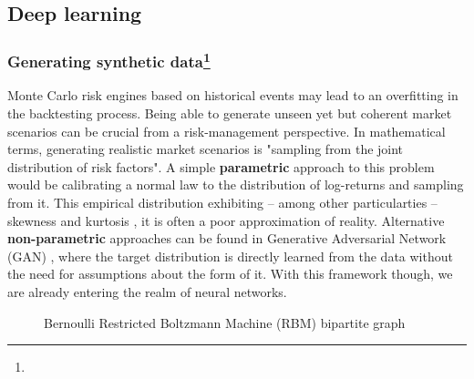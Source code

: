 \subsection{Deep learning}

\cite{gobet2000weak}

\subsubsection*{Generating synthetic data\footnote{}}

Monte Carlo risk engines based on historical events may lead to an overfitting in the backtesting process. Being able to generate unseen yet but coherent market scenarios can be crucial from a risk-management perspective.
In mathematical terms, generating realistic market scenarios is "sampling from the joint distribution of risk factors". A simple \textbf{parametric} approach to this problem would be calibrating a normal law to the distribution of log-returns and sampling from it. This empirical distribution exhibiting -- among other particularties -- skewness and kurtosis \cite{cont2001empirical}, it is often a poor approximation of reality.\newline
Alternative \textbf{non-parametric} approaches can be found in Generative Adversarial Network (GAN) \cite{goodfellow2014generative}, where the target distribution is directly learned from the data without the need for assumptions about the form of it. With this framework though, we are already entering the realm of neural networks.


\begin{figure}[H]
    \centering
    
    \caption{Bernoulli Restricted Boltzmann Machine (RBM) bipartite graph}
    \label{fig:rbm}
\end{figure}


